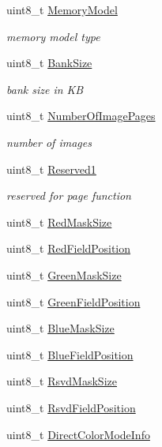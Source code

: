 \begin{DoxyCompactItemize}
uint8\+\_\+t \hyperlink{struct____attribute_____a0fe34321b6dfba9e784fbbc649aa193a}{Memory\+Model}
\begin{DoxyCompactList}\small\item\em memory model type \end{DoxyCompactList}\item 
uint8\+\_\+t \hyperlink{struct____attribute_____aa1307567cbc12f9c5c724b7457be14ad}{Bank\+Size}
\begin{DoxyCompactList}\small\item\em bank size in K\+B \end{DoxyCompactList}\item 
uint8\+\_\+t \hyperlink{struct____attribute_____a988714bc16626547fbdc31f25dfa6470}{Number\+Of\+Image\+Pages}
\begin{DoxyCompactList}\small\item\em number of images \end{DoxyCompactList}\item 
uint8\+\_\+t \hyperlink{struct____attribute_____a8ace2dfe4814abc401442986ac8a5356}{Reserved1}
\begin{DoxyCompactList}\small\item\em reserved for page function \end{DoxyCompactList}\item 
uint8\+\_\+t \hyperlink{struct____attribute_____a9ffc14e11d6b1c80b63aba344292849e}{Red\+Mask\+Size}
\item 
uint8\+\_\+t \hyperlink{struct____attribute_____a8b5b2e458757061bce7e056f7f910dae}{Red\+Field\+Position}
\item 
uint8\+\_\+t \hyperlink{struct____attribute_____af69ef188a0f5d526ecd5f25a8d6336e3}{Green\+Mask\+Size}
\item 
uint8\+\_\+t \hyperlink{struct____attribute_____a44aab7c8026a131654e079837a95ba2b}{Green\+Field\+Position}
\item 
uint8\+\_\+t \hyperlink{struct____attribute_____ab5967602a79dcb7f0061195ffdaaa47a}{Blue\+Mask\+Size}
\item 
uint8\+\_\+t \hyperlink{struct____attribute_____ada852d5ed926757d24b5038a38e6292c}{Blue\+Field\+Position}
\item 
uint8\+\_\+t \hyperlink{struct____attribute_____a73862db83bdb9b6d31356af3cec7a5be}{Rsvd\+Mask\+Size}
\item 
uint8\+\_\+t \hyperlink{struct____attribute_____a61fb6dc07b7edbd8a3a94745336f256c}{Rsvd\+Field\+Position}
\item 
uint8\+\_\+t \hyperlink{struct____attribute_____a35fb3e1fc0dc9924bc52977b3a234f9f}{Direct\+Color\+Mode\+Info}

\end{DoxyCompactItemize}
